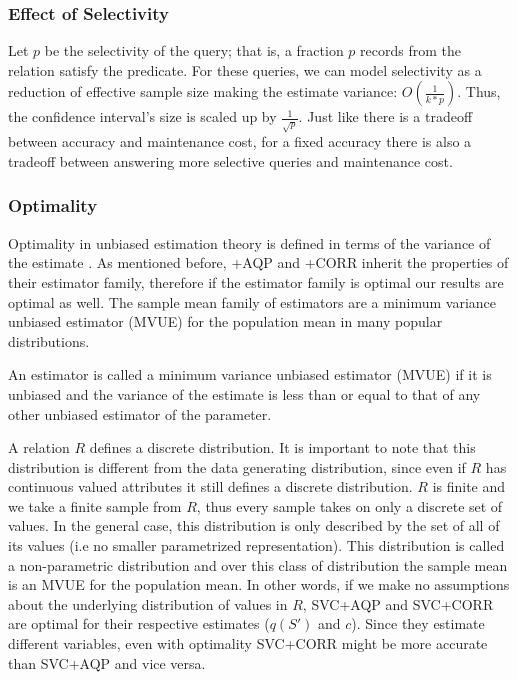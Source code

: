 \subsubsection{Effect of Selectivity}
Let $p$ be the selectivity of the query; that is, a fraction $p$ records from the relation satisfy the predicate.
For these queries, we can model selectivity as a reduction of effective sample size making the
estimate variance: $O(\frac{1}{k*p})$.
Thus, the confidence interval's size is scaled up by $\frac{1}{\sqrt{p}}$.
Just like there is a tradeoff between accuracy and maintenance cost, for a fixed accuracy 
there is also a tradeoff between answering more selective queries and maintenance cost.

\subsubsection{Optimality}
Optimality in unbiased estimation theory is defined in terms of the variance of the estimate \cite{cox1979theoretical}.
As mentioned before, \svcnospace+AQP and \svcnospace+CORR inherit the properties of their estimator family, therefore if the estimator family is optimal
our results are optimal as well.
The sample mean family of estimators are a minimum variance unbiased estimator (MVUE) for the population mean in many popular distributions.
\begin{proposition}
An estimator is called a minimum variance unbiased estimator (MVUE) if it is unbiased and the variance of the estimate is less than or equal to that of any other unbiased estimator of the parameter.
\end{proposition}

A relation $R$ defines a discrete distribution.
It is important to note that this distribution is different from the data generating distribution, since even if $R$ has continuous valued attributes
it still defines a discrete distribution.
$R$ is finite and we take a finite sample from $R$, thus every sample takes on only a discrete set of values.
In the general case, this distribution is only described by the set of all of its values (i.e no smaller parametrized representation).
This distribution is called a non-parametric distribution and over this class of distribution the sample mean is an MVUE for the population mean.
In other words, if we make no assumptions about the underlying distribution of values in $R$, SVC+AQP and SVC+CORR are optimal for their respective estimates ($q(S')$ and $c$).
Since they estimate different variables, even with optimality SVC+CORR might be more accurate than SVC+AQP and vice versa.  

